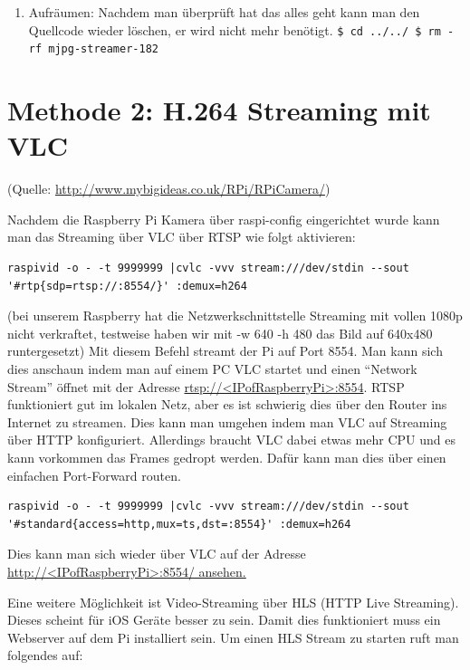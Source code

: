 \documentclass[12pt,a4paper,titlepage]{scrartcl} %
\begin{document}
\begin{enumerate}
\item Aufräumen:\newline
\textnormal{Nachdem man überprüft hat das alles geht kann man den Quellcode wieder löschen, er wird nicht mehr benötigt.}\newline
\texttt{\$ cd ../../\newline
\$ rm -rf mjpg-streamer-182}
\end{enumerate}

\newpage
\section{Methode 2: H.264 Streaming mit VLC}
\small{(Quelle: \href{http://www.mybigideas.co.uk/RPi/RPiCamera/}{http://www.mybigideas.co.uk/RPi/RPiCamera/})}
\normalsize

Nachdem die Raspberry Pi Kamera über raspi-config eingerichtet wurde kann man das Streaming über VLC über RTSP wie folgt aktivieren:

\ttfamily
\begin{lstlisting}[breaklines]
raspivid -o - -t 9999999 |cvlc -vvv stream:///dev/stdin --sout '#rtp{sdp=rtsp://:8554/}' :demux=h264
\end{lstlisting}

\normalfont
(bei unserem Raspberry hat die Netzwerkschnittstelle Streaming mit vollen 1080p nicht verkraftet, testweise haben wir mit -w 640 -h 480 das Bild auf 640x480 runtergesetzt)
Mit diesem Befehl streamt der Pi auf Port 8554. Man kann sich dies anschaun indem man auf einem PC VLC startet und einen “Network Stream” öffnet mit der Adresse \url{rtsp://<IPofRaspberryPi>:8554}. RTSP funktioniert gut im lokalen Netz, aber es ist schwierig dies über den Router ins Internet zu streamen. Dies kann man umgehen indem man VLC auf Streaming über HTTP konfiguriert. Allerdings braucht VLC dabei etwas mehr CPU und es kann vorkommen das Frames gedropt werden. Dafür kann man dies über einen einfachen Port-Forward routen.

\ttfamily
\begin{lstlisting}[breaklines]
raspivid -o - -t 9999999 |cvlc -vvv stream:///dev/stdin --sout '#standard{access=http,mux=ts,dst=:8554}' :demux=h264
\end{lstlisting}

\normalfont
Dies kann man sich wieder über VLC auf der Adresse \url{http://<IPofRaspberryPi>:8554/ ansehen.}

Eine weitere Möglichkeit ist Video-Streaming über HLS (HTTP Live Streaming). Dieses scheint für iOS Geräte besser zu sein. Damit dies funktioniert muss ein Webserver auf dem Pi installiert sein. Um einen HLS Stream zu starten ruft man folgendes auf:
\end{document}
